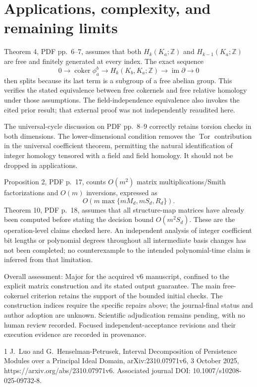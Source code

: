 \documentclass[10pt]{article}
\begin{document}
\section*{Applications, complexity, and remaining limits}
Theorem 4, PDF pp. 6–7, assumes that both \(H_k(K_a;\mathbb Z)\) and \(H_{k-1}(K_a;\mathbb Z)\) are free and finitely generated at every index. The exact sequence \[0\longrightarrow\operatorname{coker}\phi_a^b
 \longrightarrow H_k(K_b,K_a;\mathbb Z)
 \longrightarrow\operatorname{im}\partial\longrightarrow0\] then splits because its last term is a subgroup of a free abelian group. This verifies the stated equivalence between free cokernels and free relative homology under those assumptions. The field-independence equivalence also invokes the cited prior result; that external proof was not independently reaudited here.\par
The universal-cycle discussion on PDF pp. 8–9 correctly retains torsion checks in both dimensions. The lower-dimensional condition removes the \(\operatorname{Tor}\) contribution in the universal coefficient theorem, permitting the natural identification of integer homology tensored with a field and field homology. It should not be dropped in applications.\par
Proposition 2, PDF p. 17, counts \(O(m^2)\) matrix multiplications/Smith factorizations and \(O(m)\) inversions, expressed as \[O\!\left(m\max\{mM_d,mS_d,R_d\}\right).\] Theorem 10, PDF p. 18, assumes that all structure-map matrices have already been computed before stating the decision bound \(O(m^2S_d)\). These are the operation-level claims checked here. An independent analysis of integer coefficient bit lengths or polynomial degrees throughout all intermediate basis changes has not been completed; no counterexample to the intended polynomial-time claim is inferred from that limitation.\par
Overall assessment: Major for the acquired v6 manuscript, confined to the explicit matrix construction and its stated output guarantee. The main free-cokernel criterion retains the support of the bounded initial checks. The construction indices require the specific repairs above; the journal-final status and author adoption are unknown. Scientific adjudication remains pending, with no human review recorded. Focused independent-acceptance revisions and their execution evidence are recorded in provenance.\par
1 J. Luo and G. Henselman-Petrusek, Interval Decomposition of Persistence Modules over a Principal Ideal Domain, arXiv:2310.07971v6, 3 October 2025, https://arxiv.org/abs/2310.07971v6. Associated journal DOI: 10.1007/s10208-025-09732-8.\par
\end{document}
